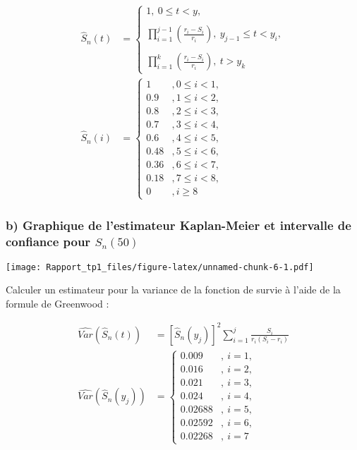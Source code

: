 \documentclass[]{article}
\begin{document}
\begin{align*}
    \hat{S}_n(t) &= \left\{
        \begin{array}{lll}
            1, \ 0\leqslant t<y,\\
            \\
            \prod\limits_{i=1}^{j-1}(\frac{r_i-S_i}{r_i})  ,\ y_{j-1}\leqslant t<y_i,\\
            \\
            \prod\limits_{i=1}^{k}(\frac{r_i-S_i}{r_i}) , \ t>y_k
        \end{array}
    \right. \\
    \hat{S}_n(i) &= \left\{
        \begin{array}{ll}
            1                   &, 0\leqslant i<1,\\
            0.9&, 1\leqslant i<2,\\
            0.8&, 2\leqslant i<3,\\
            0.7&, 3\leqslant i<4,\\
            0.6&, 4\leqslant i<5,\\
            0.48&, 5\leqslant i<6,\\
            0.36&, 6\leqslant i<7,\\
            0.18&, 7\leqslant i<8,\\
            0&, i \geqslant 8
        \end{array}
    \right.
\end{align*}

\subsubsection{\texorpdfstring{b) Graphique de l'estimateur Kaplan-Meier
et intervalle de confiance pour
\(S_n(50)\)}{b) Graphique de l'estimateur Kaplan-Meier et intervalle de confiance pour S\_n(50)}}\label{b-graphique-de-lestimateur-kaplan-meier-et-intervalle-de-confiance-pour-s_n50}

\texttt{[image: Rapport\_tp1\_files/figure-latex/unnamed-chunk-6-1.pdf]}

Calculer un estimateur pour la variance de la fonction de survie à
l'aide de la formule de Greenwood :

\begin{align*}
    \widehat{Var}(\hat{S}_n(t))
    &=[\hat{S}_n(y_j)]^2\sum_{i=1}^j\frac{S_i}{r_i(S_i-r_i)} \\
    \widehat{Var}(\hat{S}_n(y_j)) &= \left\{
        \begin{array}{ll}
            0.009&,\ i=1,\\
            0.016&,\ i=2,\\
            0.021&,\ i=3,\\
            0.024&,\ i=4,\\
            0.02688&,\ i=5,\\
            0.02592&,\ i=6,\\
            0.02268&,\ i=7
        \end{array}
    \right.
\end{align*}
\end{document}
